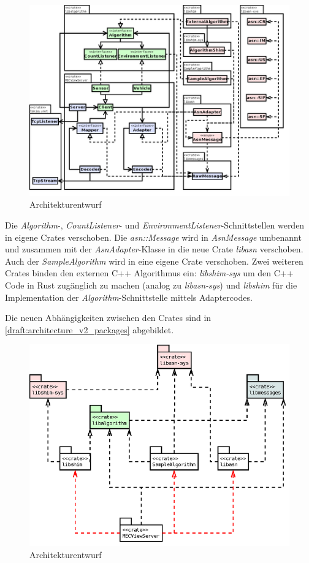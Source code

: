 \begin{figure}[H]
	\centering
	\includegraphics[width=3.3\textwidth]{dia/architecture_v2}
	\caption{Architekturentwurf}
	\label{draft:architecture_v2}
\end{figure}

Die \textit{Algorithm}-, \textit{CountListener}- und \textit{EnvironmentListener}-Schnittstellen werden in eigene Crates verschoben.
Die \textit{asn::Message} wird in \textit{AsnMessage} umbenannt und zusammen mit der \textit{AsnAdapter}-Klasse in die neue Crate \textit{libasn} verschoben.
Auch der \textit{SampleAlgorithm} wird in eine eigene Crate verschoben.
Zwei weiteren Crates binden den externen C++ Algorithmus ein: \textit{libshim-sys} um den C++ Code in Rust zugänglich zu machen (analog zu \textit{libasn-sys}) und \textit{libshim} für die Implementation der \textit{Algorithm}-Schnittstelle mittels Adaptercodes.

Die neuen Abhängigkeiten zwischen den Crates sind in \autoref{draft:architecture_v2_packages} abgebildet.

\begin{figure}[H]
	\centering
	\includegraphics[width=1.9\textwidth]{dia/architecture_v2_packages}
	\caption{Architekturentwurf}
	\label{draft:architecture_v2_packages}
\end{figure}

